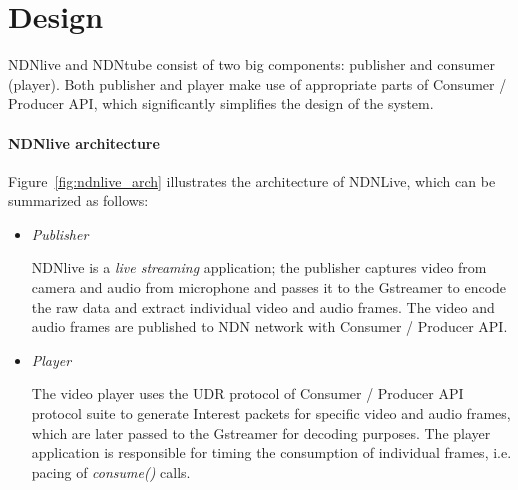\vspace{0.3cm}
\section{Design} %
\label{sec:arch}
NDNlive and NDNtube consist of two big components: publisher and consumer (player). Both publisher and player make use of appropriate parts of Consumer / Producer API, which significantly simplifies the design of the system.

\paragraph{NDNlive architecture} %
\vspace{0.3cm}
\label{par:ndnlive_arch}
Figure~\ref{fig:ndnlive_arch} illustrates the architecture of NDNLive, which can be summarized as follows:

\begin{itemize}
  \item \textit{Publisher}

  NDNlive is a \textit{live streaming} application; the publisher captures video from camera and audio from microphone and passes it to the Gstreamer to encode the raw data and extract individual video and audio frames. The video and audio frames are published to NDN network with Consumer / Producer API. 

  \item \textit{Player}

  The video player uses the UDR protocol of Consumer / Producer API protocol suite to generate Interest packets for specific video and audio frames, which are later passed to the Gstreamer for decoding purposes. The player application is responsible for timing the consumption of individual frames, i.e. pacing of \textit{consume()} calls.

\end{itemize}


